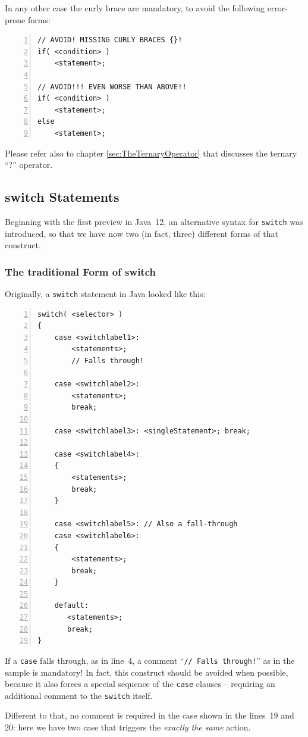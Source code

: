 \documentclass[12pt,a4paper,titlepage, parskip=half, headsepline, footsepline, cleardoubleplain]{scrbook}
\begin{document}
In any other case the curly brace are mandatory, to avoid the following error-prone forms:

\begin{lstlisting}[numbers=left]
// AVOID! MISSING CURLY BRACES {}!
if( <condition> )
    <statement>;

// AVOID!!! EVEN WORSE THAN ABOVE!!    
if( <condition> )
    <statement>;
else
    <statement>;
\end{lstlisting}

Please refer also to chapter \vref{sec:TheTernaryOperator} that discusses the ternary “?” operator.


\subsection{switch Statements}\label{sec:SwitchStatements}
Beginning with the first preview in Java~12, an alternative syntax for \lstinline|switch| was introduced, so that we have now two (in fact, three) different forms of that construct.

\subsubsection{The traditional Form of switch}
Originally, a \lstinline|switch| statement in Java looked like this:
\begin{lstlisting}[numbers=left]
switch( <selector> )
{
    case <switchlabel1>:
        <statements>;
        // Falls through!

    case <switchlabel2>:
        <statements>;
        break;

    case <switchlabel3>: <singleStatement>; break;

    case <switchlabel4>:
    {
        <statements>;
        break;
    }

    case <switchlabel5>: // Also a fall-through
    case <switchlabel6>:
    {
        <statements>;
        break;
    }

    default:
       <statements>;
       break;
}
\end{lstlisting}

If a \lstinline|case| falls through, as in line~4, a comment “\lstinline|// Falls through!|” as in the sample is mandatory! In fact, this construct should be avoided when possible, because it also forces a special sequence of the \lstinline|case| clauses – requiring an additional comment to the \lstinline|switch| itself.

Different to that, no comment is required in the case shown in the lines~19 and 20: here we have two case that triggers the \textit{exactly the same} action.
\end{document}
